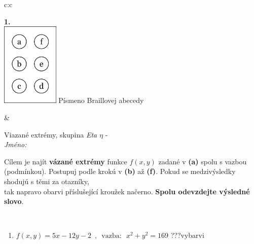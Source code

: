 \documentclass[10pt]{report}
\begin{document}
\begin{tabular}{c:c}
\begin{minipage}[c][104.5mm][t]{0.5\linewidth}
\begin{center}
\begin{minipage}{0.79\linewidth}
\begin{center}
\begin{varwidth}{\linewidth}
\begin{enumerate}
\end{enumerate}
\end{varwidth}
\end{center}
\end{minipage}
\begin{minipage}{0.20\linewidth}
\begin{center}
{\Huge\bfseries 1.} \\[2mm]
\includegraphics[height=40mm]{../images/braille.png}
{\small Písmeno Braillovej abecedy}
\end{center}
\end{minipage}
\end{center}
\end{minipage}
&
\begin{minipage}[c][104.5mm][t]{0.5\linewidth}
\begin{center}
\vspace{7mm}
{\huge Viazané extrémy, skupina \textit{Eta $\eta$} -}\\[5mm]
\textit{Jméno:}\phantom{xxxxxxxxxxxxxxxxxxxxxxxxxxxxxxxxxxxxxxxxxxxxxxxxxxxxxxxxxxxxxxxxx}\\[5mm]
\begin{minipage}{0.95\linewidth}
\begin{center}
Cílem je najít \textbf{vázané extrémy} funkce $f(x,y)$ zadané v \textbf{(a)} spolu s vazbou (podmínkou). Postupuj podle krokú v \textbf{(b)} až \textbf{(f)}. Pokud se medzivýsledky shodujú s těmi za otazníky,\\tak napravo obarvi příslušející kroužek načerno. \textbf{Spolu odevzdejte výsledné slovo}.
\end{center}
\end{minipage}
\\[1mm]
\begin{minipage}{0.79\linewidth}
\begin{center}
\begin{varwidth}{\linewidth}
\begin{enumerate}
\normalsize
\item $f(x,y)=5x-12y-2 \enspace , \enspace \mathrm{vazba:} \enspace x^2+y^2=169$\quad \dotfill\; ???\;\dotfill \quad vybarvi

\end{enumerate}
\end{varwidth}
\end{center}
\end{minipage}
\end{center}
\end{minipage}
\end{tabular}
\end{document}
